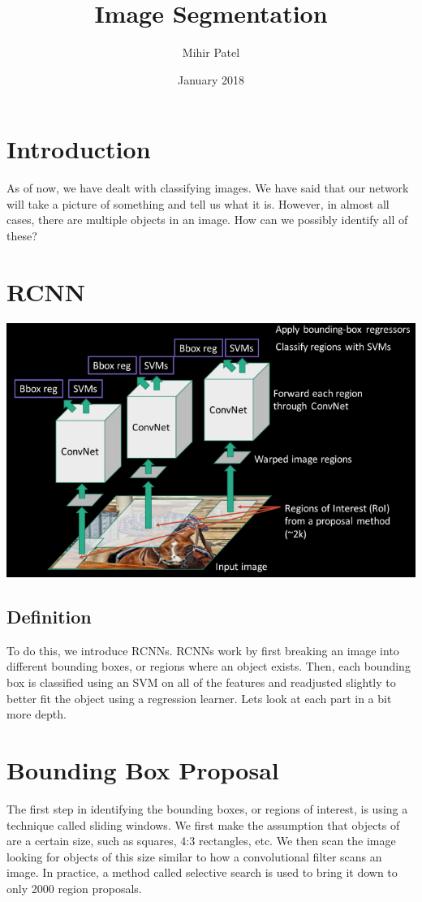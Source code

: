 \documentclass{article}
\title{Image Segmentation}
\author{Mihir Patel}
\date{January 2018}
\begin{document}
\maketitle

\section{Introduction}
As of now, we have dealt with classifying images. We have said that our network will take a picture of something and tell us what it is. However, in almost all cases, there are multiple objects in an image. How can we possibly identify all of these?

\section{RCNN}
\begin{center}
\includegraphics[scale=0.5]{RCNN}
\end{center}
\subsection{Definition}
To do this, we introduce RCNNs. RCNNs work by first breaking an image into different bounding boxes, or regions where an object exists. Then, each bounding box is classified using an SVM on all of the features and readjusted slightly to better fit the object using a regression learner. Lets look at each part in a bit more depth.

\section{Bounding Box Proposal}
The first step in identifying the bounding boxes, or regions of interest, is using a technique called sliding windows. We first make the assumption that objects of are a certain size, such as squares, 4:3 rectangles, etc. We then scan the image looking for objects of this size similar to how a convolutional filter scans an image. In practice, a method called selective search is used to bring it down to only 2000 region proposals.
\end{document}
